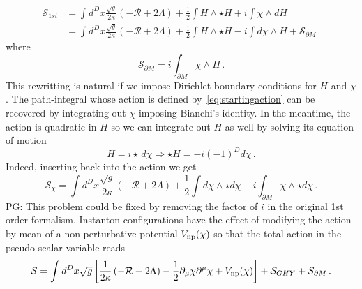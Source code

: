 \documentclass[a4paper]{article}
\newcommand{\purple}[1]{{\color{purple} #1 \color{black}}}
\newcommand{\PG}[1]{{\purple{PG: #1}}} %
\begin{document}
\begin{equation}
  \begin{aligned}
    \mathcal{S}_{1st} &= \int d^Dx \frac{\sqrt{g}}{2\kappa}\left(-\mathcal{R}+2\Lambda\right) +\frac{1}{2}\int H \wedge \star H + i \int\chi \wedge dH\\
    &= \int d^Dx \frac{\sqrt{g}}{2\kappa}\left(-\mathcal{R}+2\Lambda\right) +\frac{1}{2}\int H \wedge \star H - i \int d\chi \wedge H + \mathcal{S}_{\partial M}\,.
  \end{aligned}
\end{equation}
where
\begin{equation}
  \mathcal{S}_{\partial M}= i \int_{\partial M}\chi \wedge H\,.
\end{equation}
This rewritting is natural if we impose Dirichlet boundary conditions for $H$ and $\chi$. The path-integral whose action is defined by~\eqref{eq:startingaction} can be recovered by integrating out $\chi$ imposing Bianchi's identity. In the meantime, the action is quadratic in $H$ so we can integrate out $H$ as well by solving its equation of motion
\begin{equation}
  H = i \star \,d \chi \Rightarrow \star H = -i (-1)^{D} d \chi\,.
\end{equation}
Indeed, inserting back into the action we get
\begin{equation}
\mathcal{S}_{\chi} = \int d^Dx \frac{\sqrt{g}}{2\kappa}\left(-\mathcal{R}+2\Lambda\right) + \frac{1}{2} \int d \chi \wedge \star d\chi -i \int_{\partial M} \chi \wedge \star d\chi\,.
\end{equation}
\PG{This problem could be fixed by removing the factor of $i$ in the original 1st order formalism.}
Instanton configurations have the effect of modifying the action by mean of a non-perturbative potential $V_{\rm np}(\chi)$ so that the total action in the pseudo-scalar variable reads
\begin{equation}
  \mathcal{S}=\int d^Dx \sqrt{g}\left[\frac{1}{2\kappa}\left(-\mathcal{R}+2\Lambda\right)-\frac{1}{2}\partial_\mu\chi \partial^\mu \chi + V_{\rm np}(\chi)\right]+ \mathcal{S}_{GHY} + S_{\partial M}\,.
\end{equation}
\end{document}
